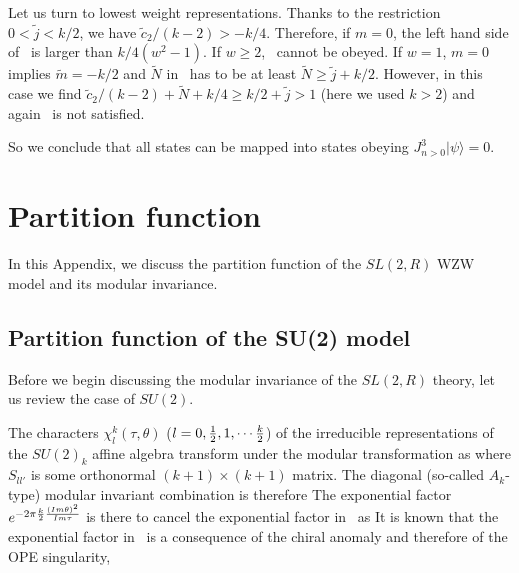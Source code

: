 Let us turn to lowest weight representations.
Thanks to the restriction $0<\tilde j < k/2 $,
 we have $\tilde c_2/(k-2) > -k/4$.
Therefore, if $m=0$, the left hand side of \newmass\ is 
larger than $ k/4( w^2 -1) $. If $w \geq 2$,
\newmass\ cannot be obeyed.
If $w=1$, $m=0$ implies $\tilde{m} = - k/2$ 
and 
$\tilde{N}$ in \newmass\ has to be at least $\tilde{N}\geq \tilde j +k/2$. 
However, in this case we find 
$\tilde c_2/(k-2) +\tilde{N} + k/4   \geq k/2 + \tilde j > 1$  (here we used $k>2$)
and again \newmass\ is not satisfied. 

So we conclude that all states can be mapped into states obeying
$J^3_{n>0} |\psi \rangle =0$. 




\section{Partition function}


In this Appendix, we discuss the partition function of
the $SL(2,R)$ WZW model and its modular invariance.

\subsection{Partition function of the SU(2) model}

Before we begin discussing the modular invariance of
the $SL(2,R)$ theory, let us review the case of $SU(2)$. 

The characters $\chi_l^{k}(\tau,\theta)$ ($l=0, {1\over 2}, 1, \cdots
{k \over 2}$)
of the irreducible representations of the $SU(2)_k$ affine algebra
transform under the modular transformation as
where $S_{ll'}$ is some orthonormal $(k+1) \times (k+1)$
matrix. The diagonal (so-called $A_k$-type) modular invariant
combination is therefore
The exponential factor  
$e^{-2\pi {k \over 2} {(Im \theta)^2 \over Im \tau}}$ 
is there to cancel the exponential factor in \sumod\ as
It is known that the exponential factor in \suinv\ is a consequence
of the chiral anomaly and therefore of the OPE singularity,

